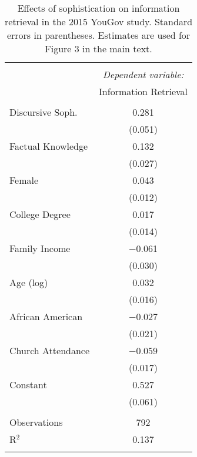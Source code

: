 
\begin{table}[!htbp] \centering 
  \caption{Effects of sophistication on information retrieval in the 2015 YouGov study.
          Standard errors in parentheses. Estimates are used for Figure 3 in the main text.} 
  \label{tab:yg_disease} 
\begin{tabular}{@{\extracolsep{0pt}}lc} 
\\[-1.8ex]\hline 
\hline \\[-1.8ex] 
 & \multicolumn{1}{c}{\textit{Dependent variable:}} \\ 
\cline{2-2} 
 & Information Retrieval \\ 
\hline \\[-1.8ex] 
 Discursive Soph. & 0.281 \\ 
  & (0.051) \\ 
  Factual Knowledge & 0.132 \\ 
  & (0.027) \\ 
  Female & 0.043 \\ 
  & (0.012) \\ 
  College Degree & 0.017 \\ 
  & (0.014) \\ 
  Family Income & $-$0.061 \\ 
  & (0.030) \\ 
  Age (log) & 0.032 \\ 
  & (0.016) \\ 
  African American & $-$0.027 \\ 
  & (0.021) \\ 
  Church Attendance & $-$0.059 \\ 
  & (0.017) \\ 
  Constant & 0.527 \\ 
  & (0.061) \\ 
 \hline \\[-1.8ex] 
Observations & 792 \\ 
R$^{2}$ & 0.137 \\ 
\hline 
\hline \\[-1.8ex] 
\end{tabular} 
\end{table} 

